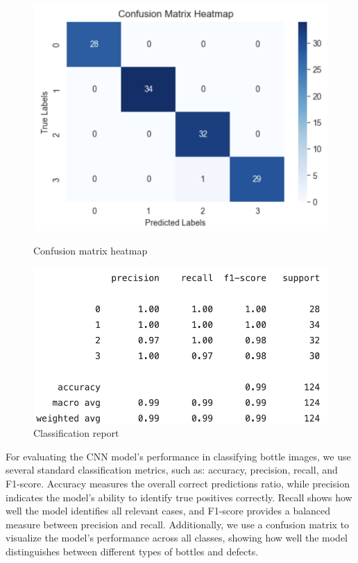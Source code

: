 \begin{figure}[H]
    \centering
    \begin{minipage}{0.48\textwidth}
        \centering
        \includegraphics[scale=0.25]{src/images/heatmap_metric.png}
        \vspace{-0.3cm}
        \caption{Confusion matrix heatmap}
        \label{fig:heatmap}
    \end{minipage}
    \hfill
    \begin{minipage}{0.48\textwidth}
        \centering
        \vspace{0.4cm}
        \includegraphics[scale=0.33]{src/images/cnn_report.png}
        \vspace{0.15cm}
        \caption{Classification report}
        \label{fig:report}
    \end{minipage}
\end{figure}


For evaluating the CNN model's performance in classifying bottle images, we use several standard classification metrics, such as: accuracy, precision, recall, and F1-score.
Accuracy measures the overall correct predictions ratio, while precision indicates the model's ability to identify true positives correctly. 
Recall shows how well the model identifies all relevant cases, and F1-score provides a balanced measure between precision and recall. Additionally, we use a confusion matrix to visualize the model's performance across all classes, showing how well the model distinguishes between different types of bottles and defects.

